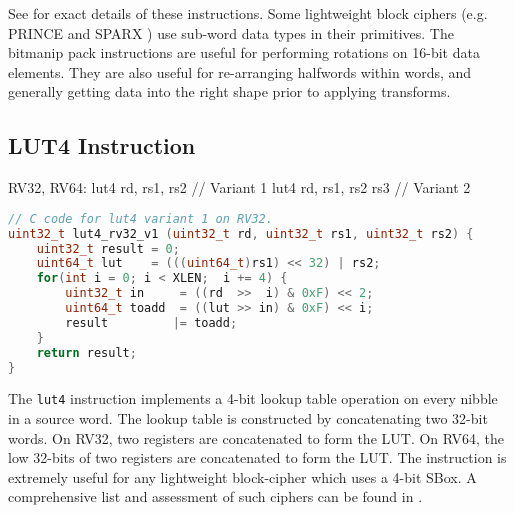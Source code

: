 See \cite[Section 2.1.4]{riscv:bitmanip:draft} for exact details of
these instructions.
Some lightweight block ciphers
(e.g.
PRINCE \cite{block:prince}
and
SPARX \cite{DPUVGB:16}) use
sub-word data types in their primitives.
The bitmanip pack instructions are useful for performing rotations on
16-bit data elements.
They are also useful for re-arranging halfwords within words, and
generally getting data into the right shape prior to applying transforms.




\subsection{LUT4 Instruction}

\begin{isa}
RV32, RV64:
    lut4    rd, rs1, rs2        // Variant 1
    lut4    rd, rs1, rs2 rs3    // Variant 2
\end{isa}

\begin{lstlisting}[language=c]
// C code for lut4 variant 1 on RV32.
uint32_t lut4_rv32_v1 (uint32_t rd, uint32_t rs1, uint32_t rs2) {
    uint32_t result = 0;
    uint64_t lut    = (((uint64_t)rs1) << 32) | rs2;
    for(int i = 0; i < XLEN;  i += 4) {
        uint32_t in     = ((rd  >>  i) & 0xF) << 2;
        uint64_t toadd  = ((lut >> in) & 0xF) << i;
        result         |= toadd;
    }
    return result;
}
\end{lstlisting}

The {\tt lut4} instruction implements a 4-bit lookup table operation
on every nibble in a source word.
The lookup table is constructed by concatenating two 32-bit words.
On RV32, two \XLEN registers are concatenated to form the LUT.
On RV64, the low 32-bits of two \XLEN registers are concatenated to form
the LUT.
The instruction is extremely useful for any lightweight block-cipher
which uses a 4-bit SBox.
A comprehensive list and assessment of such ciphers can be found
in \cite{TGMGD:19}.

